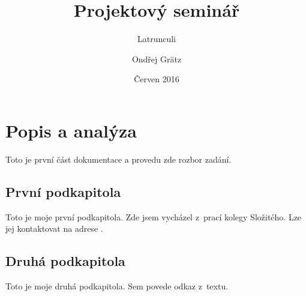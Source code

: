 \documentclass[12pt]{article}
\title{Projektový seminář}
\subtitle{Latrunculi}
\author{Ondřej Grätz}
\date{Červen 2016}
\begin{document}
\maketitle

\newpage
\section{Popis a analýza}
Toto je první část dokumentace a provedu zde rozbor zadání.

\subsection{První podkapitola}
Toto je moje první podkapitola.
Zde jsem vycházel z~prací kolegy Složitého. Lze jej kontaktovat 
na adrese .

\subsection{Druhá podkapitola}
Toto je moje druhá podkapitola. Sem povede odkaz z~textu.
\end{document}
